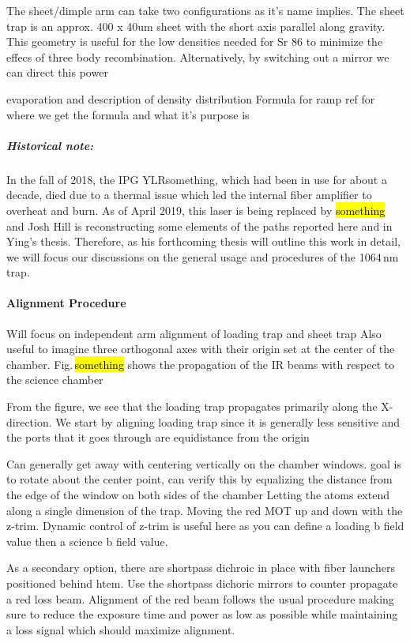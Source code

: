The sheet/dimple arm can take two configurations as it's name implies. The sheet trap is an approx. 400 x 40um sheet with the short axis parallel along gravity. This geometry is useful for the low densities needed for Sr 86 to minimize the effecs of three body recombination. Alternatively, by switching out a mirror we can direct this power 

evaporation and description of density distribution
Formula for ramp
ref for where we get the formula and what it's purpose is

\subparagraph{Historical note:}
In the fall of 2018, the IPG YLRsomething, which had been in use for about a decade, died due to a thermal issue which led the internal fiber amplifier to overheat and burn.
As of April 2019, this laser is being replaced by \hl{something} and Josh Hill is reconstructing some elements of the paths reported here and in Ying's thesis.
Therefore, as his forthcoming thesis will outline this work in detail, we will focus our discussions on the general usage and procedures of the 1064\,nm trap.


\paragraph{Alignment Procedure} \label{sssec:1064_align}
Will focus on independent arm alignment of loading trap and sheet trap
Also useful to imagine three orthogonal axes with their origin set at the center of the chamber.
Fig.\,\hl{something} shows the propagation of the IR beams with respect to the science chamber


From the figure, we see that the loading trap propagates primarily along the X-direction. 
We start by aligning loading trap since it is generally less sensitive and the ports that it goes through are equidistance from the origin

Can generally get away with centering vertically on the chamber windows. 
goal is to rotate about the center point, can verify this by equalizing the distance from the edge of the window on both sides of the chamber
Letting the atoms extend along a single dimension of the trap. 
Moving the red MOT up and down with the z-trim. Dynamic control of z-trim is useful here as you can define a loading b field value then a science b field value.

As a secondary option, there are shortpass dichroic in place with fiber launchers positioned behind htem.
Use the shortpass dichoric mirrors to counter propagate a red loss beam. Alignment of the red beam follows the usual procedure making sure to reduce the exposure time and power as low as possible while maintaining a loss signal which should maximize alignment.


